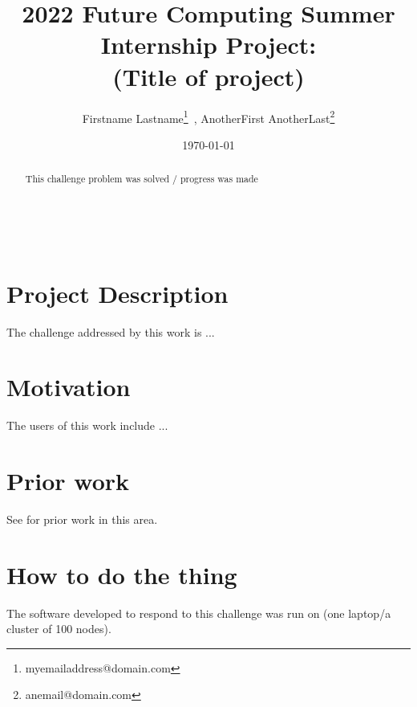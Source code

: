 \documentclass{article}
\begin{document}
    \begin{minipage}[h]{\textwidth}
        \title{2022 Future Computing Summer Internship Project:\\(Title of project)}
        \author{Firstname Lastname\footnote{myemailaddress@domain.com}\ , 
        AnotherFirst AnotherLast\footnote{anemail@domain.com}}
        \date{\today}
            \maketitle
        \begin{abstract}
            This challenge problem was solved / progress was made
        \end{abstract}
    \end{minipage}

\ \\


\section{Project Description} %

The challenge addressed by this work is ...

\section{Motivation} %

The users of this work include ...

\section{Prior work} %

See \cite{texbook} for prior work in this area.

\section{How to do the thing}

The software developed to respond to this challenge was run on (one laptop/a cluster of 100 nodes).
\end{document}
